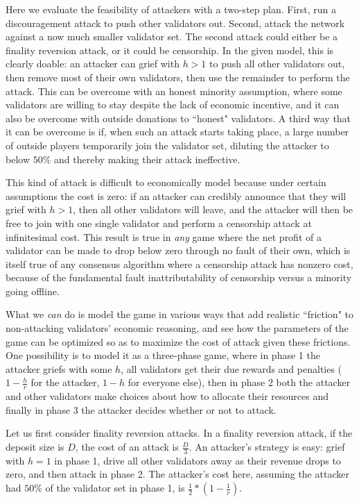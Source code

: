 \documentclass[12pt]{article}
\begin{document}
Here we evaluate the feasibility of attackers with a two-step plan. First, run a discouragement attack to push other validators out. Second, attack the network against a now much smaller validator set. The second attack could either be a finality reversion attack, or it could be censorship. In the given model, this is clearly doable: an attacker can grief with $h > 1$ to push all other validators out, then remove most of their own validators, then use the remainder to perform the attack. This can be overcome with an honest minority assumption, where some validators are willing to stay despite the lack of economic incentive, and it can also be overcome with outside donations to ``honest" validators. A third way that it can be overcome is if, when such an attack starts taking place, a large number of outside players temporarily join the validator set, diluting the attacker to below $50\%$ and thereby making their attack ineffective.

This kind of attack is difficult to economically model because under certain assumptions the cost is zero: if an attacker can credibly announce that they will grief with $h > 1$, then all other validators will leave, and the attacker will then be free to join with one single validator and perform a censorship attack at infinitesimal cost. This result is true in \textit{any} game where the net profit of a validator can be made to drop below zero through no fault of their own, which is itself true of any consensus algorithm where a censorship attack has nonzero cost, because of the fundamental fault inattributability of censorship versus a minority going offline.

What we \textit{can} do is model the game in various ways that add realistic ``friction" to non-attacking validators' economic reasoning, and see how the parameters of the game can be optimized so as to maximize the cost of attack given these frictions. One possibility is to model it as a three-phase game, where in phase 1 the attacker griefs with some $h$, all validators get their due rewards and penalties ($1 - \frac{h}{r}$ for the attacker, $1 - h$ for everyone else), then in phase 2 both the attacker and other validators make choices about how to allocate their resources and finally in phase 3 the attacker decides whether or not to attack.

Let us first consider finality reversion attacks. In a finality reversion attack, if the deposit size is $D$, the cost of an attack is $\frac{D}{3}$. An attacker's strategy is easy: grief with $h = 1$ in phase 1, drive all other validators away as their revenue drops to zero, and then attack in phase 2. The attacker's cost here, assuming the attacker had $50\%$ of the validator set in phase 1, is $\frac{1}{2} * (1 - \frac{1}{r})$.
\end{document}
